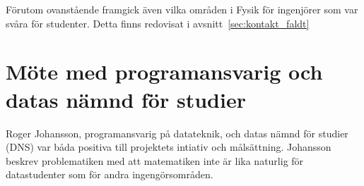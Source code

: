 Förutom ovanstående framgick även vilka områden i Fysik för ingenjörer som var
svåra för studenter. Detta finns redovisat i avsnitt~\ref{sec:kontakt_faldt}

\section{Möte med programansvarig och datas nämnd för studier}

Roger Johansson, programansvarig på datateknik, och datas nämnd för studier (DNS)
var båda positiva till projektets intiativ och målsättning. Johansson beskrev
problematiken med att matematiken inte är lika naturlig för datastudenter som för
andra ingengörsområden.
